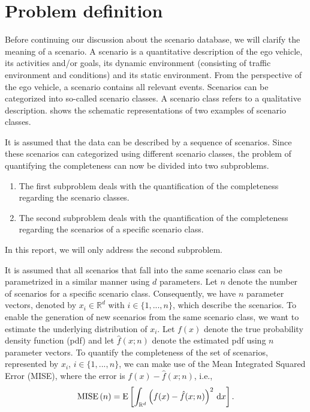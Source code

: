 \documentclass[10pt,final,a4paper,oneside,onecolumn]{article}
\newcommand*{\ud}{\mathrm{\,d}}                                 %
\newcommand{\expectation}[1]{\textup{E} \left[ #1 \right]}
\newcommand{\mise}[1]{\textup{MISE} \left( #1 \right)}
\theoremstyle{plain}\newtheorem{definition}{Definition}[section]    %
\theoremstyle{definition}\newtheorem{example}{Example}[section]     %
\theoremstyle{remark}\newtheorem{remarkenv}{Remark}[section]        %
\begin{document}
\section{Problem definition}
\label{sec:problem}

Before continuing our discussion about the scenario database, we will clarify the meaning of a scenario. A scenario is a quantitative description of the ego vehicle, its activities and/or goals, its dynamic environment (consisting of traffic environment and conditions) and its static environment. From the perspective of the ego vehicle, a scenario contains all relevant events. Scenarios can be categorized into so-called scenario classes. A scenario class refers to a qualitative description.  shows the schematic representations of two examples of scenario classes.

It is assumed that the data can be described by a sequence of scenarios. Since these scenarios can categorized using different scenario classes, the problem of quantifying the completeness can now be divided into two subproblems.
\begin{enumerate}
	\item The first subproblem deals with the quantification of the completeness regarding the scenario classes.
	\item The second subproblem deals with the quantification of the completeness regarding the scenarios of a specific scenario class.
\end{enumerate}
In this report, we will only address the second subproblem. 

It is assumed that all scenarios that fall into the same scenario class can be parametrized in a similar manner using $d$ parameters. Let $n$ denote the number of scenarios for a specific scenario class. Consequently, we have $n$ parameter vectors, denoted by $x_i \in \mathbb{R}^d$ with $i\in\{1,...,n\}$, which describe the scenarios. To enable the generation of new scenarios from the same scenario class, we want to estimate the underlying distribution of $x_i$. Let $f(x)$ denote the true probability density function (pdf) and let $\hat{f}(x;n)$ denote the estimated pdf using $n$ parameter vectors. To quantify the completeness of the set of scenarios, represented by $x_i$, $i\in\{1,...,n\}$, we can make use of the Mean Integrated Squared Error (MISE), where the error is $f(x)-\hat{f}(x;n)$, i.e.,
\begin{equation} \label{eq:mise}
	\mise{n} = \expectation{ \int_{\mathbb{R}^d} \left(f(x) - \hat{f}(x;n)\right)^2 \ud x}.
\end{equation}
\end{document}
